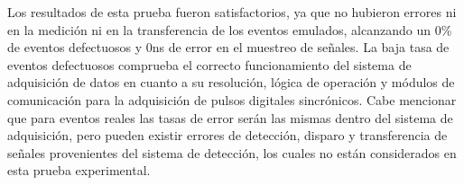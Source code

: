 	Los resultados de esta prueba fueron satisfactorios, ya que no hubieron errores ni en la medición ni en la transferencia de los eventos emulados, alcanzando un 0\% de eventos defectuosos y 0ns de error en el muestreo de señales. La baja tasa de eventos defectuosos comprueba el correcto funcionamiento del sistema de adquisición de datos en cuanto a su resolución, lógica de operación y módulos de comunicación para la adquisición de pulsos digitales sincrónicos. Cabe mencionar que para eventos reales las tasas de error serán las mismas dentro del sistema de adquisición, pero pueden existir errores de detección, disparo y transferencia de señales provenientes del sistema de detección, los cuales no están considerados en esta prueba experimental.
	
	\begin{table}[ht]
		\centering
\end{table}
